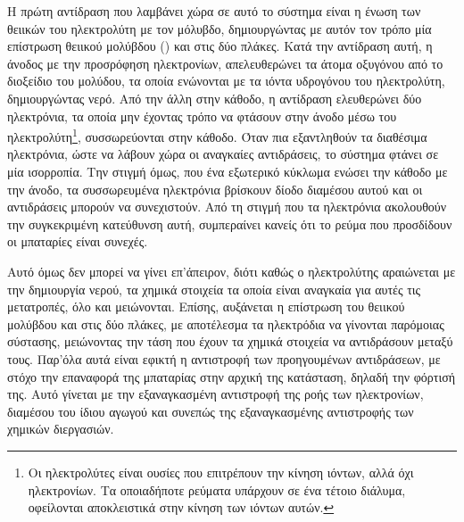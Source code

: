 \documentclass[12pt]{report}
\begin{document}
Η πρώτη αντίδραση που λαμβάνει χώρα σε αυτό το σύστημα είναι η ένωση των θειικών του ηλεκτρολύτη με τον μόλυβδο, δημιουργώντας με αυτόν τον τρόπο μία επίστρωση θειικού μολύβδου ({}) και στις δύο πλάκες. 
Κατά την αντίδραση αυτή, η άνοδος με την προσρόφηση ηλεκτρονίων, απελευθερώνει τα άτομα οξυγόνου από το διοξείδιο του μολύδου, τα οποία ενώνονται με τα ιόντα υδρογόνου του ηλεκτρολύτη, δημιουργώντας νερό. Από την άλλη στην κάθοδο,
η αντίδραση ελευθερώνει δύο ηλεκτρόνια, τα οποία μην έχοντας τρόπο να φτάσουν στην άνοδο μέσω του ηλεκτρολύτη\footnote{Οι ηλεκτρολύτες είναι ουσίες που επιτρέπουν την κίνηση ιόντων, αλλά όχι ηλεκτρονίων. Τα οποιαδήποτε ρεύματα
υπάρχουν σε ένα τέτοιο διάλυμα, οφείλονται αποκλειστικά στην κίνηση των ιόντων αυτών.}, συσσωρεύονται στην κάθοδο. Όταν πια εξαντληθούν τα διαθέσιμα ηλεκτρόνια, ώστε να λάβουν χώρα οι αναγκαίες αντιδράσεις, το σύστημα φτάνει σε
μία ισορροπία. Την στιγμή όμως, που ένα εξωτερικό κύκλωμα ενώσει την κάθοδο με την άνοδο, τα συσσωρευμένα ηλεκτρόνια βρίσκουν δίοδο διαμέσου αυτού και οι αντιδράσεις μπορούν να συνεχιστούν. Από τη στιγμή που τα ηλεκτρόνια ακολουθούν
την συγκεκριμένη κατεύθυνση αυτή, συμπεραίνει κανείς ότι το ρεύμα που προσδίδουν οι μπαταρίες είναι συνεχές.

Αυτό όμως δεν μπορεί να γίνει επ'άπειρον, διότι καθώς ο ηλεκτρολύτης αραιώνεται με την δημιουργία νερού, τα χημικά στοιχεία τα οποία είναι αναγκαία για αυτές τις μετατροπές, όλο και μειώνονται. 
Επίσης, αυξάνεται η επίστρωση του θειικού μολύβδου και στις δύο πλάκες, με αποτέλεσμα τα ηλεκτρόδια να γίνονται παρόμοιας σύστασης, μειώνοντας την τάση που έχουν τα χημικά στοιχεία να αντιδράσουν μεταξύ τους. 
Παρ'όλα αυτά είναι εφικτή η αντιστροφή των προηγουμένων αντιδράσεων, με στόχο την επαναφορά της μπαταρίας στην αρχική της κατάσταση, δηλαδή την φόρτισή της. 
Αυτό γίνεται με την εξαναγκασμένη αντιστροφή της ροής των ηλεκτρονίων, διαμέσου του ίδιου αγωγού και συνεπώς της εξαναγκασμένης αντιστροφής των χημικών διεργασιών. 

\begin{figure}[h]
				\center
				{}
				\captionsetup{width=0.8\textwidth}
				\label{eq:battery}
\end{figure}
\end{document}
